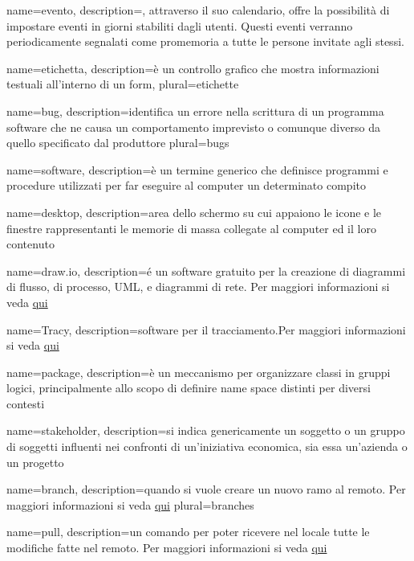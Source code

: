  {
	name=evento,
	description={, attraverso il suo calendario, offre la possibilità di impostare eventi in giorni stabiliti dagli utenti. Questi eventi verranno periodicamente segnalati come promemoria a tutte le persone invitate agli stessi.}
}

 {
	name=etichetta,
	description={è un controllo grafico che mostra informazioni testuali all'interno di un form},
	plural=etichette
}

 {
	name=bug,
	description={identifica un errore nella scrittura di un programma software che ne causa un comportamento imprevisto o comunque diverso da quello specificato dal produttore}
	plural=bugs
}

 {
	name=software,
	description={è un termine generico che definisce programmi e procedure utilizzati per far eseguire al computer un determinato compito}
}

 {
	name=desktop,
	description={area dello schermo su cui appaiono le icone e le finestre rappresentanti le memorie di massa collegate al computer ed il loro contenuto}
}

 {
	name=draw.io,
	description={é un software gratuito per la creazione di diagrammi di flusso, di processo, UML, e diagrammi di rete. Per maggiori informazioni si veda \href{https://www.draw.io}{qui}}
}

 {
	name=Tracy,
	description={software  per il tracciamento.Per maggiori informazioni si veda \href{http://tracy-tpiga.rhcloud.com/tracy/}{qui}}
}

 {
	name=package,
	description={è un meccanismo per organizzare classi  in gruppi logici, principalmente allo scopo di definire name space distinti per diversi contesti}
}

 {
	name=stakeholder,
	description={si indica genericamente un soggetto o un gruppo di soggetti influenti nei confronti di un'iniziativa economica, sia essa un'azienda o un progetto}
}

 {
	name=branch,
	description={quando si vuole creare un nuovo ramo al  remoto. Per maggiori informazioni si veda \href{https://git-scm.com/docs/}{qui}}
	plural=branches
}

 {
	name=pull,
	description={un comando  per poter ricevere nel locale tutte le modifiche fatte nel  remoto. Per maggiori informazioni si veda \href{https://git-scm.com/docs/}{qui}}
}

